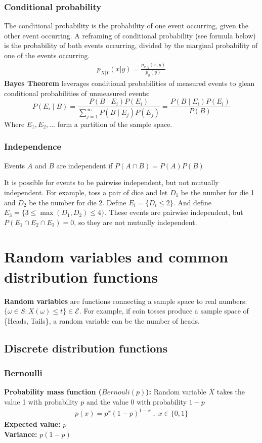 \documentclass{article}
\begin{document}
\subsubsection{Conditional probability}
The conditional probability is the probability of one event occurring, given the other event occurring. A reframing of conditional probability (see formula below) is the probability of both events occurring, divided by the marginal probability of one of the events occurring. 
\begin{align*}
    p_{X|Y}(x|y) = \frac{p_{x,y}(x,y)}{p_y(y)}
\end{align*}
\textbf{Bayes Theorem} leverages conditional probabilities of measured events to glean conditional probabilities of unmeasured events:
\begin{equation*}
    P(E_i \mid B) = \frac{P(B \mid E_i)P(E_i)}{\sum_{j=1}^\infty P(B \mid E_j)P(E_j)} = \frac{P(B \mid E_i)P(E_i)}{P(B)}
\end{equation*}
Where $E_1, E_2, \dots$ form a partition of the sample space.

\subsubsection{Independence}
Events $A$ and $B$ are independent if $P(A\cap B) = P(A)P(B)$

It is possible for events to be pairwise independent, but not mutually independent. For example, toss a pair of dice and let $D_1$ be the number for die 1 and $D_2$ be the number for die 2. Define $E_i = \{D_i \leq 2\}$. And define $E_3 = \{ 3 \leq \max(D_1, D_2) \leq 4 \}$. These events are pairwise independent, but $P(E_1\cap E_2 \cap E_3) = 0$, so they are not mutually independent. 

\section{Random variables and common distribution functions}
\textbf{Random variables} are functions connecting a sample space to real numbers: $\{ \omega \in S : X(\omega) \leq t \} \in \mathcal{E}$. 
For example, if coin tosses produce a sample space of \{Heads, Tails\}, a random variable can be the number of heads. 

\subsection{Discrete distribution functions}
\subsubsection{Bernoulli}
\textbf{Probability mass function ($Bernouli(p)$):} Random variable $X$ takes the value 1 with probability $p$ and the value 0 with probability $1-p$
\begin{align*}
    p(x) = p^x(1-p)^{1-x} \;,\; x \in \{0, 1\}
\end{align*}
\textbf{Expected value:} $p$\\
\textbf{Variance:} $p(1-p)$
\end{document}
